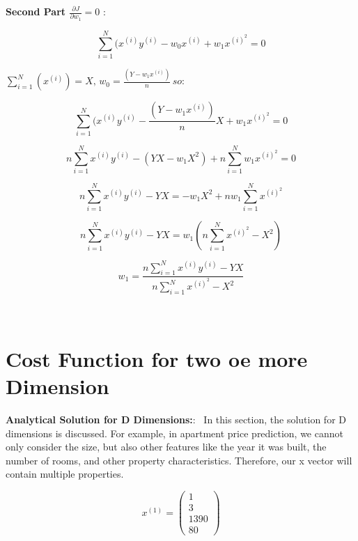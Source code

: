 \documentclass{article}
\newenvironment{cheatformula}[1][כותרת]{
    \begin{minipage}{\linewidth}
    \textbf{#1}:
}{
    \end{minipage}\\[2ex]
}
\begin{document}
\begin{multicols*}{2}
\begin{cheatformula}[Second Part $\frac{\partial J}{\partial w_{1}} = 0$ ]
\begin{equation}
\sum_{i=1}^{N} (x^{(i)}y^{(i)} - w_{0}x^{(i)} + w_{1}x^{(i)^{2}} = 0
\end{equation}

$ \sum_{i=1}^{N} (x^{(i)})=X   ,\,  w_{0} = \frac{(Y -w_{1}x^{(i)})}{n} \, so: $

\begin{equation}
\sum_{i=1}^{N} (x^{(i)}y^{(i)} - \frac{(Y -w_{1}x^{(i)})}{n} X  + w_{1}x^{(i)^{2}} = 0
\end{equation}

\begin{equation}
n \sum_{i=1}^{N} x^{(i)}y^{(i)} - {(YX -w_{1}X^{2})}   + n\sum_{i=1}^{N}w_{1}x^{(i)^{2}} = 0
\end{equation}

\begin{equation}
n \sum_{i=1}^{N} x^{(i)}y^{(i)} - YX=  - w_{1}X^{2}   + n w_{1}\sum_{i=1}^{N}x^{(i)^{2}}
\end{equation}

\begin{equation}
n \sum_{i=1}^{N} x^{(i)}y^{(i)} - YX = w_{1} (n \sum_{i=1}^{N}x^{(i)^{2}} - X^{2})
\end{equation}

\begin{equation}
w_{1} = \frac{n \sum_{i=1}^{N} x^{(i)}y^{(i)} - YX}{n \sum_{i=1}^{N}x^{(i)^{2}} - X^{2}}
\end{equation}

 
\end{cheatformula}
\pagebreak


\section{Cost Function for two oe more Dimension}
\begin{cheatformula}[Analytical Solution for D Dimensions:]\
In this section, the solution for D dimensions is discussed. For example, in apartment price prediction, we cannot only consider the size, but also other features like the year it was built, the number of rooms, and other property characteristics. Therefore, our x vector will contain multiple properties.

\begin{equation}
x ^{(1)}= \begin{pmatrix}
 1\\ 3 \\1390 \\80
\end{pmatrix}
\end{equation}


\end{cheatformula}
\end{multicols*}
\end{document}
